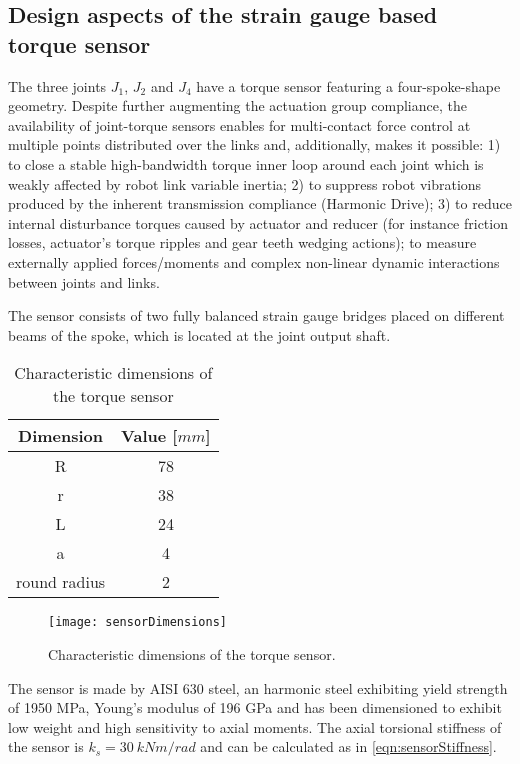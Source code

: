 \subsection{Design aspects of the strain gauge based torque sensor}
\label{subsec:DesignTorqueSensor}
The three joints $J_1$, $J_2$ and $J_4$ have a torque sensor featuring a four-spoke-shape geometry. 
Despite further augmenting the actuation group compliance, the availability of joint-torque sensors enables for multi-contact force control at multiple points distributed over the links and, additionally, makes it possible: 1) to close a stable high-bandwidth torque inner loop around each joint which is weakly affected by robot link variable inertia; 2) to suppress robot vibrations produced by the inherent transmission compliance (Harmonic Drive); 3) to reduce internal disturbance torques caused by actuator and reducer (for instance friction losses, actuator's torque ripples and gear teeth wedging actions); to measure externally applied forces/moments and complex non-linear dynamic interactions between joints and links.
\par The sensor consists of two fully balanced strain gauge bridges placed on different beams of the spoke, which is located at the joint output shaft. 
%
%
\begin{table}[t]
	\renewcommand{\arraystretch}{1.3}
	\caption{Characteristic dimensions of the torque sensor}
	\label{tab:sensorDimension}
	\centering
	\begin{tabular}{c c}
		\hline \hline
		\bfseries Dimension & \bfseries Value [$mm$] \\
		\hline
		R & 78 \\
		r & 38 \\
		L & 24 \\
		a & 4 \\
		round radius & 2 \\
		\hline \hline
	\end{tabular}
\end{table} 
%
\begin{figure}[]
	\centering
	\texttt{[image: sensorDimensions]}
	\caption{Characteristic dimensions of the torque sensor.}
	\label{fig:sensorDimensions}
\end{figure}
%
The sensor is made by AISI 630 steel, an harmonic steel exhibiting yield strength of 1950 MPa, Young's modulus of 196 GPa and has been dimensioned to exhibit low weight and high sensitivity to axial moments.
The axial torsional stiffness of the sensor is $k_s = 30 \ kNm/rad$ and can be calculated as in \eqref{eqn:sensorStiffness}.
